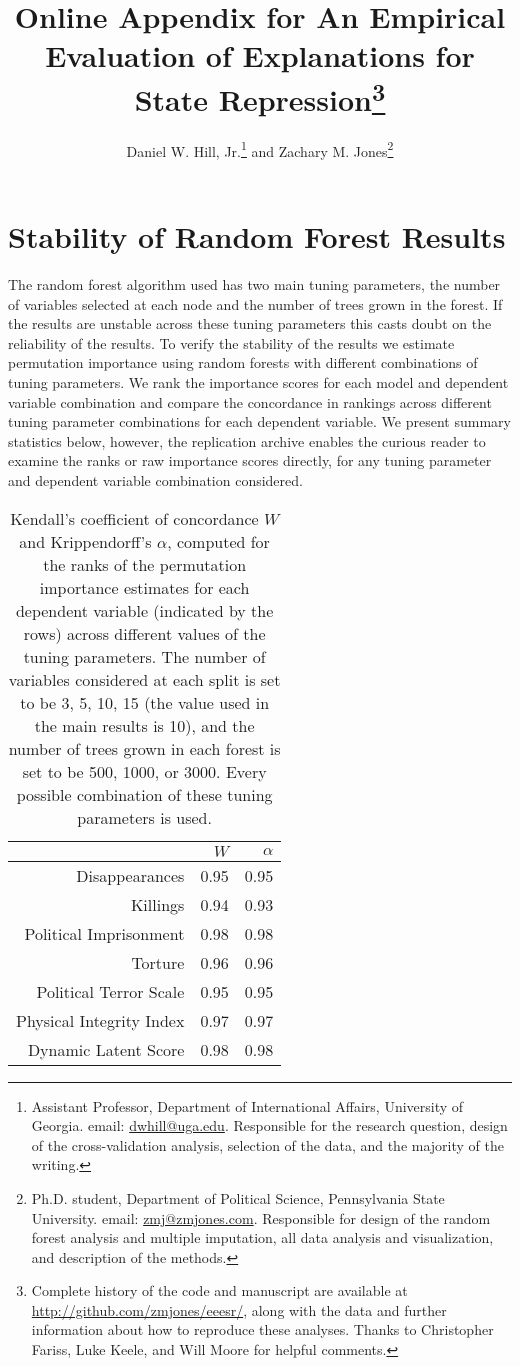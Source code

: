 \documentclass[11pt]{article}
\title{Online Appendix for An Empirical Evaluation of Explanations for State Repression\thanks{Complete history of the code and manuscript are available at \url{http://github.com/zmjones/eeesr/}, along with the data and further information about how to reproduce these analyses. Thanks to Christopher Fariss, Luke Keele, and Will Moore for helpful comments.}}
\author{Daniel W. Hill, Jr.\thanks{Assistant Professor, Department of International Affairs,
University of Georgia. email: \href{mailto:dwhill@uga.edu}{dwhill@uga.edu}. Responsible for the research question, design of the cross-validation analysis, selection of the data, and the majority of the writing.} and Zachary M. Jones\thanks{Ph.D. student, Department of Political Science, Pennsylvania State University. email: \href{mailto:zmj@zmjones.com}{zmj@zmjones.com}. Responsible for design of the random forest analysis and multiple imputation, all data analysis and visualization, and description of the methods.}}
\date{}
\begin{document}
\maketitle

\section*{Stability of Random Forest Results}

The random forest algorithm used has two main tuning parameters, the number of variables selected at each node and the number of trees grown in the forest. If the results are unstable across these tuning parameters this casts doubt on the reliability of the results. To verify the stability of the results we estimate permutation importance using random forests with different combinations of tuning parameters. We rank the importance scores for each model and dependent variable combination and compare the concordance in rankings across different tuning parameter combinations for each dependent variable. We present summary statistics below, however, the replication archive enables the curious reader to examine the ranks or raw importance scores directly, for any tuning parameter and dependent variable combination considered.

\begin{table}[ht]
\centering
\begin{tabular}{rrr}
  \hline
 & $W$ & $\alpha$ \\ 
  \hline
Disappearances & 0.95 & 0.95 \\ 
  Killings & 0.94 & 0.93 \\ 
  Political Imprisonment & 0.98 & 0.98 \\ 
  Torture & 0.96 & 0.96 \\ 
  Political Terror Scale & 0.95 & 0.95 \\ 
  Physical Integrity Index & 0.97 & 0.97 \\ 
  Dynamic Latent Score & 0.98 & 0.98 \\ 
   \hline
\end{tabular}
\caption{Kendall's coefficient of concordance $W$ and Krippendorff's $\alpha$, computed for the ranks of the permutation importance estimates for each dependent variable (indicated by the rows) across different values of the tuning parameters. The number of variables considered at each split is set to be 3, 5, 10, 15 (the value used in the main results is 10), and the number of trees grown in each forest is set to be 500, 1000, or 3000. Every possible combination of these tuning parameters is used.}
\end{table}
\end{document}

